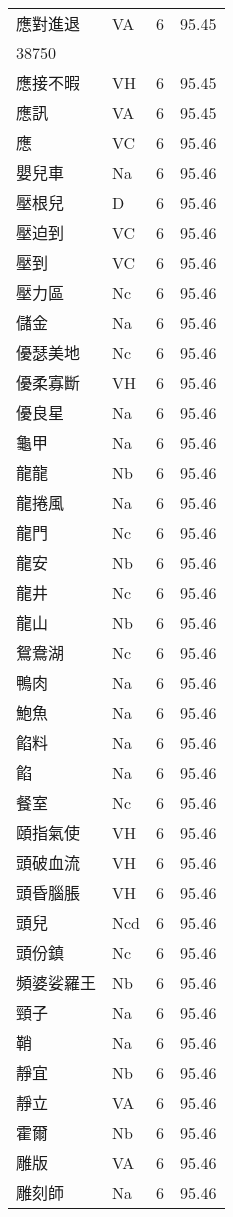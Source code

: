\documentclass[twocolumn]{book}
\begin{document}
\begin{supertabular}{llrr}
應對進退 & VA & 6 &  95.45\\
38750\\
應接不暇 & VH & 6 &  95.45\\
應訊 & VA & 6 &  95.45\\
應 & VC & 6 &  95.46\\
嬰兒車 & Na & 6 &  95.46\\
壓根兒 & D & 6 &  95.46\\
壓迫到 & VC & 6 &  95.46\\
壓到 & VC & 6 &  95.46\\
壓力區 & Nc & 6 &  95.46\\
儲金 & Na & 6 &  95.46\\
優瑟美地 & Nc & 6 &  95.46\\
優柔寡斷 & VH & 6 &  95.46\\
優良星 & Na & 6 &  95.46\\
龜甲 & Na & 6 &  95.46\\
龍龍 & Nb & 6 &  95.46\\
龍捲風 & Na & 6 &  95.46\\
龍門 & Nc & 6 &  95.46\\
龍安 & Nb & 6 &  95.46\\
龍井 & Nc & 6 &  95.46\\
龍山 & Nb & 6 &  95.46\\
鴛鴦湖 & Nc & 6 &  95.46\\
鴨肉 & Na & 6 &  95.46\\
鮑魚 & Na & 6 &  95.46\\
餡料 & Na & 6 &  95.46\\
餡 & Na & 6 &  95.46\\
餐室 & Nc & 6 &  95.46\\
頤指氣使 & VH & 6 &  95.46\\
頭破血流 & VH & 6 &  95.46\\
頭昏腦脹 & VH & 6 &  95.46\\
頭兒 & Ncd & 6 &  95.46\\
頭份鎮 & Nc & 6 &  95.46\\
頻婆娑羅王 & Nb & 6 &  95.46\\
頸子 & Na & 6 &  95.46\\
鞘 & Na & 6 &  95.46\\
靜宜 & Nb & 6 &  95.46\\
靜立 & VA & 6 &  95.46\\
霍爾 & Nb & 6 &  95.46\\
雕版 & VA & 6 &  95.46\\
雕刻師 & Na & 6 &  95.46\\

\end{supertabular}
\end{document}
